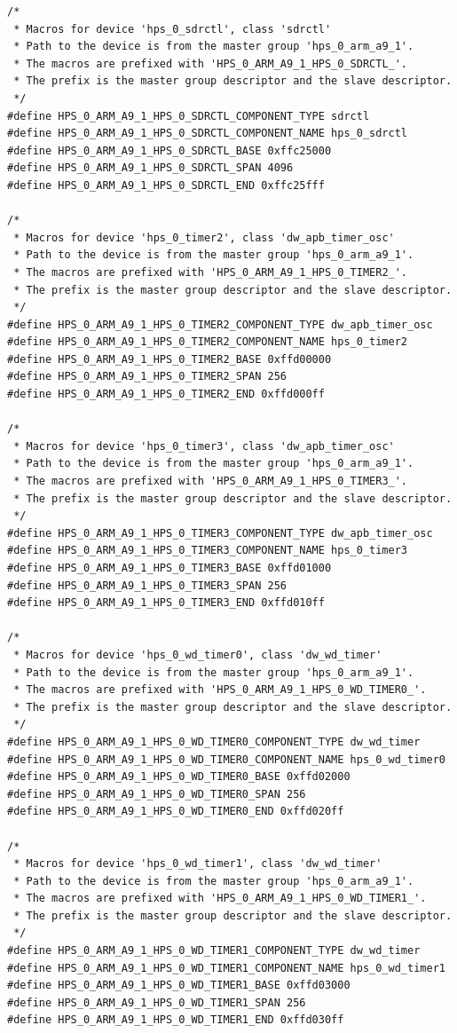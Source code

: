 \documentclass[conference]{IEEEtran}
\begin{document}
\begin{lstlisting}
/*
 * Macros for device 'hps_0_sdrctl', class 'sdrctl'
 * Path to the device is from the master group 'hps_0_arm_a9_1'.
 * The macros are prefixed with 'HPS_0_ARM_A9_1_HPS_0_SDRCTL_'.
 * The prefix is the master group descriptor and the slave descriptor.
 */
#define HPS_0_ARM_A9_1_HPS_0_SDRCTL_COMPONENT_TYPE sdrctl
#define HPS_0_ARM_A9_1_HPS_0_SDRCTL_COMPONENT_NAME hps_0_sdrctl
#define HPS_0_ARM_A9_1_HPS_0_SDRCTL_BASE 0xffc25000
#define HPS_0_ARM_A9_1_HPS_0_SDRCTL_SPAN 4096
#define HPS_0_ARM_A9_1_HPS_0_SDRCTL_END 0xffc25fff

/*
 * Macros for device 'hps_0_timer2', class 'dw_apb_timer_osc'
 * Path to the device is from the master group 'hps_0_arm_a9_1'.
 * The macros are prefixed with 'HPS_0_ARM_A9_1_HPS_0_TIMER2_'.
 * The prefix is the master group descriptor and the slave descriptor.
 */
#define HPS_0_ARM_A9_1_HPS_0_TIMER2_COMPONENT_TYPE dw_apb_timer_osc
#define HPS_0_ARM_A9_1_HPS_0_TIMER2_COMPONENT_NAME hps_0_timer2
#define HPS_0_ARM_A9_1_HPS_0_TIMER2_BASE 0xffd00000
#define HPS_0_ARM_A9_1_HPS_0_TIMER2_SPAN 256
#define HPS_0_ARM_A9_1_HPS_0_TIMER2_END 0xffd000ff

/*
 * Macros for device 'hps_0_timer3', class 'dw_apb_timer_osc'
 * Path to the device is from the master group 'hps_0_arm_a9_1'.
 * The macros are prefixed with 'HPS_0_ARM_A9_1_HPS_0_TIMER3_'.
 * The prefix is the master group descriptor and the slave descriptor.
 */
#define HPS_0_ARM_A9_1_HPS_0_TIMER3_COMPONENT_TYPE dw_apb_timer_osc
#define HPS_0_ARM_A9_1_HPS_0_TIMER3_COMPONENT_NAME hps_0_timer3
#define HPS_0_ARM_A9_1_HPS_0_TIMER3_BASE 0xffd01000
#define HPS_0_ARM_A9_1_HPS_0_TIMER3_SPAN 256
#define HPS_0_ARM_A9_1_HPS_0_TIMER3_END 0xffd010ff

/*
 * Macros for device 'hps_0_wd_timer0', class 'dw_wd_timer'
 * Path to the device is from the master group 'hps_0_arm_a9_1'.
 * The macros are prefixed with 'HPS_0_ARM_A9_1_HPS_0_WD_TIMER0_'.
 * The prefix is the master group descriptor and the slave descriptor.
 */
#define HPS_0_ARM_A9_1_HPS_0_WD_TIMER0_COMPONENT_TYPE dw_wd_timer
#define HPS_0_ARM_A9_1_HPS_0_WD_TIMER0_COMPONENT_NAME hps_0_wd_timer0
#define HPS_0_ARM_A9_1_HPS_0_WD_TIMER0_BASE 0xffd02000
#define HPS_0_ARM_A9_1_HPS_0_WD_TIMER0_SPAN 256
#define HPS_0_ARM_A9_1_HPS_0_WD_TIMER0_END 0xffd020ff

/*
 * Macros for device 'hps_0_wd_timer1', class 'dw_wd_timer'
 * Path to the device is from the master group 'hps_0_arm_a9_1'.
 * The macros are prefixed with 'HPS_0_ARM_A9_1_HPS_0_WD_TIMER1_'.
 * The prefix is the master group descriptor and the slave descriptor.
 */
#define HPS_0_ARM_A9_1_HPS_0_WD_TIMER1_COMPONENT_TYPE dw_wd_timer
#define HPS_0_ARM_A9_1_HPS_0_WD_TIMER1_COMPONENT_NAME hps_0_wd_timer1
#define HPS_0_ARM_A9_1_HPS_0_WD_TIMER1_BASE 0xffd03000
#define HPS_0_ARM_A9_1_HPS_0_WD_TIMER1_SPAN 256
#define HPS_0_ARM_A9_1_HPS_0_WD_TIMER1_END 0xffd030ff


\end{lstlisting}
\end{document}
